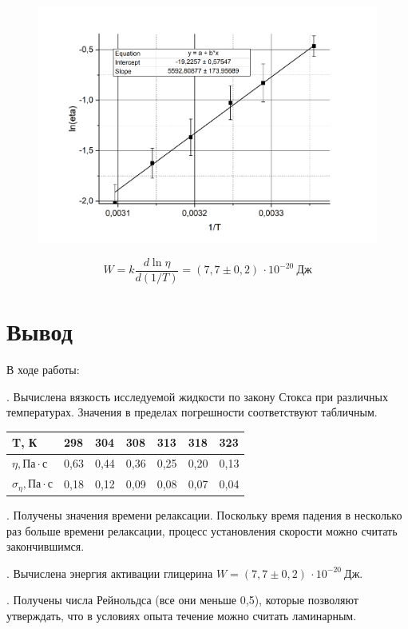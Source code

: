 \documentclass[a4paper,12pt]{article} %
\begin{document}
\begin{figure}[h!]
	\begin{center}
		\includegraphics[width = 1\textwidth]{1.png}
	\end{center}
\end{figure}

\[
W = k \frac{d\ln\eta}{d(1/T)} = (7,7 \pm 0,2)\,\cdot 10^{-20}\ \text{Дж}
\]

\newpage

\section{Вывод}

\noindent В ходе работы:

\medskip

. Вычислена вязкость исследуемой жидкости по закону Стокса при различных температурах. Значения в пределах погрешности соответствуют табличным.

\begin{table}[h!]
\begin{tabular}{|l|l|l|l|l|l|l|}
\hline
T, К                                    & 298  & 304  & 308  & 313  & 318  & 323  \\ \hline
$\eta, \text{Па} \cdot \text{с}$        & 0,63 & 0,44 & 0,36 & 0,25 & 0,20 & 0,13 \\ \hline
$\sigma_\eta, \text{Па} \cdot \text{с}$ & 0,18 & 0,12 & 0,09 & 0,08 & 0,07 & 0,04 \\ \hline
\end{tabular}
\end{table}

. Получены значения времени релаксации. Поскольку время падения в несколько раз больше времени релаксации, процесс установления скорости можно считать закончившимся.

\medskip

. Вычислена энергия активации глицерина $W = (7,7 \pm 0,2)\,\cdot 10^{-20}\ \text{Дж}$.

. Получены числа Рейнольдса (все они меньше 0,5), которые позволяют утверждать, что в условиях опыта течение можно считать ламинарным.

\medskip 
\end{document}
